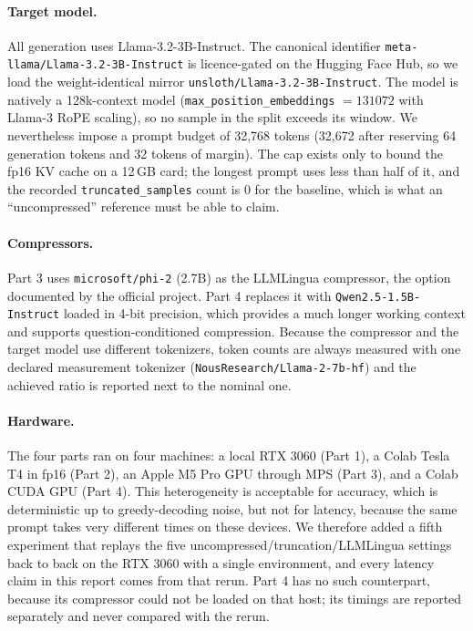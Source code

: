 \documentclass[10pt,a4paper,twocolumn]{article}
\begin{document}
\paragraph{Target model.} All generation uses Llama-3.2-3B-Instruct. The canonical
identifier \texttt{meta-llama/Llama-3.2-3B-Instruct} is licence-gated on the
Hugging Face Hub, so we load the weight-identical mirror
\texttt{unsloth/Llama-3.2-3B-Instruct}. The model is natively a 128k-context model
(\texttt{max\_position\_embeddings} $=131072$ with Llama-3 RoPE scaling), so no
sample in the split exceeds its window. We nevertheless impose a prompt budget of
32{,}768 tokens (32{,}672 after reserving 64 generation tokens and 32 tokens of
margin). The cap exists only to bound the fp16 KV cache on a 12\,GB card; the
longest prompt uses less than half of it, and the recorded
\texttt{truncated\_samples} count is 0 for the baseline, which is what an
``uncompressed'' reference must be able to claim.

\paragraph{Compressors.} Part 3 uses \texttt{microsoft/phi-2} (2.7B) as the
LLMLingua compressor, the option documented by the official project. Part 4
replaces it with \texttt{Qwen2.5-1.5B-Instruct} loaded in 4-bit precision, which
provides a much longer working context and supports question-conditioned
compression. Because the compressor and the target model use different tokenizers,
token counts are always measured with one declared measurement tokenizer
(\texttt{NousResearch/Llama-2-7b-hf}) and the achieved ratio is reported next to
the nominal one.

\paragraph{Hardware.} The four parts ran on four machines: a local RTX 3060
(Part 1), a Colab Tesla T4 in fp16 (Part 2), an Apple M5 Pro GPU through MPS
(Part 3), and a Colab CUDA GPU (Part 4). This heterogeneity is acceptable for
accuracy, which is deterministic up to greedy-decoding noise, but not for
latency, because the same prompt takes very different times on these devices. We
therefore added a fifth experiment that replays the five
uncompressed/truncation/LLMLingua settings back to back on the RTX 3060 with a
single environment, and every latency claim in this report comes from that rerun.
Part 4 has no such counterpart, because its compressor could not be loaded on that
host; its timings are reported separately and never compared with the rerun.
\end{document}
